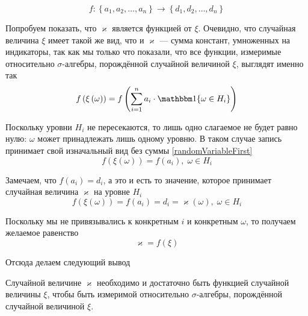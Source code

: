 $$f: \left\{ a_1, a_2, \dots, a_n \right\}
  \rightarrow \left\{ d_1, d_2, \dots, d_n \right\}$$

Попробуем показать, что $\varkappa$ является функцией от $\xi$.
Очевидно, что случайная величина $\xi$ имеет такой же вид,
что и $\varkappa$ --- сумма констант, умноженных на индикаторы,
так как мы только что показали, что все функции,
измеримые относительно $\sigma$-алгебры, порождённой случайной величиной $\xi$,
выглядят именно так
$$f\left( \xi\left( \omega \right) \right)
  = f\left( \sum_{i=1}^n a_i \cdot \Indicator{\omega \in H_i} \right)$$

Поскольку уровни $H_i$ не пересекаются,
то лишь одно слагаемое не будет равно нулю:
$\omega$ может принадлежать лишь одному уровню.
В таком случае запись принимает свой изначальный вид без суммы
\eqref{randomVariableFirst}
$$f\left( \xi\left( \omega \right) \right)
  = f\left( a_i \right),\; \omega \in H_i$$

Замечаем, что $f\left( a_i \right) = d_i$, а это и есть то значение,
которое принимает случайная величина $\varkappa$ на уровне $H_i$
$$f\left( \xi\left( \omega \right) \right)
  = f\left( a_i \right) = d_i
  = \varkappa\left( \omega \right),\; \omega \in H_i$$

Поскольку мы не привязывались к конкретным $i$ и конкретным $\omega$,
то получаем желаемое равенство
$$\varkappa = f\left( \xi \right)$$

Отсюда делаем следующий вывод
\begin{affirmation}\label{measurableRandomVariable}
  Случайной величине $\varkappa$
  необходимо и достаточно быть функцией случайной величины $\xi$,
  чтобы быть измеримой относительно $\sigma$-алгебры,
  порождённой случайной величиной $\xi$.
\end{affirmation}